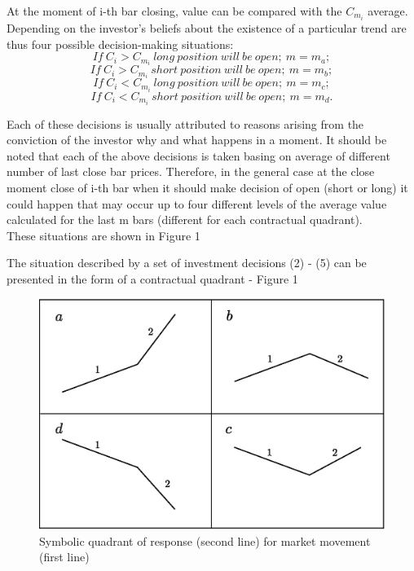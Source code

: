 \documentclass{tewiart}
\begin{document}
At the moment of i-th bar closing, value can be compared with the $C_{m_{i}}$ average. Depending on the investor's beliefs about the existence of a particular trend are thus four possible decision-making situations:
\begin{equation} If\ C_i  > C_{m_{i}}\   long\ position\ will\ be\ open;\ m=m_a; \end{equation}
\begin{equation} If\ C_i  > C_{m_{i}}\   short\ position\ will\ be\ open;\ m=m_b; \end{equation}
\begin{equation} If\ C_i  < C_{m_{i}}\   long\ position\ will\ be\ open;\ m=m_c; \end{equation}
\begin{equation} If\ C_i  < C_{m_{i}}\   short\ position\ will\ be\ open;\ m=m_d. \end{equation}

Each of these decisions is usually attributed to reasons arising from the conviction of the investor why and what happens in a moment. It should be noted that each of the above decisions is taken basing on average of different number of last close bar prices. Therefore, in the general case at the close moment close of i-th bar when it should make decision of open (short or long) it could happen that may occur up to four different levels of the average value calculated for the last m bars (different for each contractual quadrant).\\
These situations are shown in Figure 1

The situation described by a set of investment decisions (2) - (5) can be presented in the form of a contractual quadrant - Figure 1


\begin{figure}[h!]
 \centering
 \includegraphics[width=\textwidth]{Rysunek0_all2.eps}
 \caption{Symbolic quadrant of response (second line) for market movement (first line)}
\end{figure}
\FloatBarrier
\end{document}
